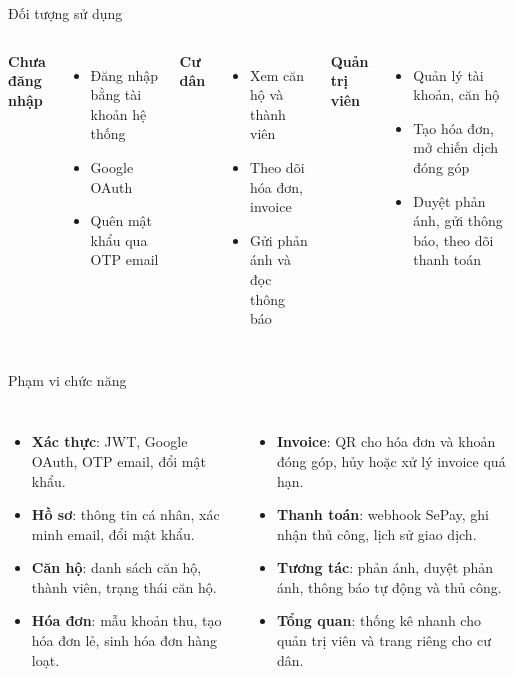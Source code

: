 \documentclass[t, aspectratio=169]{beamer}
\newcommand{\keyword}[1]{\textcolor{hustprimary}{\textbf{#1}}}
\begin{document}
\begin{frame}{Đối tượng sử dụng}
\begin{columns}[T,onlytextwidth]
\textbf{\textcolor{hustprimary}{Chưa đăng nhập}}
\begin{itemize}
  \item Đăng nhập bằng tài khoản hệ thống
  \item Google OAuth
  \item Quên mật khẩu qua OTP email
\end{itemize}
\textbf{\textcolor{hustprimary}{Cư dân}}
\begin{itemize}
  \item Xem căn hộ và thành viên
  \item Theo dõi hóa đơn, invoice
  \item Gửi phản ánh và đọc thông báo
\end{itemize}
\textbf{\textcolor{hustprimary}{Quản trị viên}}
\begin{itemize}
  \item Quản lý tài khoản, căn hộ
  \item Tạo hóa đơn, mở chiến dịch đóng góp
  \item Duyệt phản ánh, gửi thông báo, theo dõi thanh toán
\end{itemize}
\end{columns}
\end{frame}

\begin{frame}{Phạm vi chức năng}
\begin{columns}[T,onlytextwidth]
\begin{itemize}
  \item \keyword{Xác thực}: JWT, Google OAuth, OTP email, đổi mật khẩu.
  \item \keyword{Hồ sơ}: thông tin cá nhân, xác minh email, đổi mật khẩu.
  \item \keyword{Căn hộ}: danh sách căn hộ, thành viên, trạng thái căn hộ.
  \item \keyword{Hóa đơn}: mẫu khoản thu, tạo hóa đơn lẻ, sinh hóa đơn hàng loạt.
\end{itemize}
\begin{itemize}
  \item \keyword{Invoice}: QR cho hóa đơn và khoản đóng góp, hủy hoặc xử lý invoice quá hạn.
  \item \keyword{Thanh toán}: webhook SePay, ghi nhận thủ công, lịch sử giao dịch.
  \item \keyword{Tương tác}: phản ánh, duyệt phản ánh, thông báo tự động và thủ công.
  \item \keyword{Tổng quan}: thống kê nhanh cho quản trị viên và trang riêng cho cư dân.
\end{itemize}
\end{columns}
\end{frame}
\end{document}
